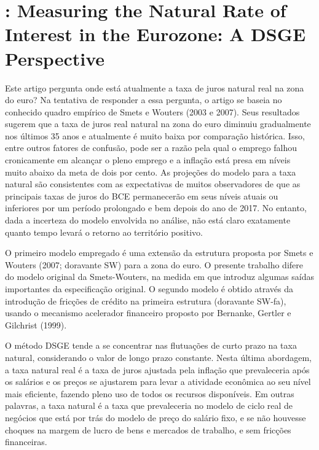 \section{\citet{Hristov:2016}: Measuring the Natural Rate of Interest in the Eurozone: A DSGE Perspective}

Este artigo pergunta onde está atualmente a taxa de juros natural real na zona do euro? Na tentativa de responder a essa pergunta, o artigo se baseia no conhecido quadro empírico de Smets e Wouters (2003 e 2007). Seus resultados sugerem que a taxa de juros real natural na zona do euro diminuiu gradualmente nos últimos 35 anos e atualmente é muito baixa por comparação histórica. Isso, entre outros fatores de confusão, pode ser a razão pela qual o emprego falhou cronicamente em alcançar o pleno emprego e a inflação está presa em níveis muito abaixo da meta de dois por cento. As projeções do modelo para a taxa natural são consistentes com as expectativas de muitos observadores de que as principais taxas de juros do BCE permanecerão em seus níveis atuais ou inferiores por um período prolongado e bem depois do ano de 2017. No entanto, dada a incerteza do modelo envolvida no análise, não está claro exatamente quanto tempo levará o retorno ao território positivo.

O primeiro modelo empregado é uma extensão da estrutura proposta por Smets e Wouters (2007; doravante SW) para a zona do euro. O presente trabalho difere do modelo original da Smets-Wouters, na medida em que introduz algumas saídas importantes da especificação original. O segundo modelo é obtido através da introdução de fricções de crédito na primeira estrutura (doravante SW-fa), usando o mecanismo acelerador financeiro proposto por Bernanke, Gertler e Gilchrist (1999).

O método DSGE tende a se concentrar nas flutuações de curto prazo na taxa natural, considerando o valor de longo prazo constante. Nesta última abordagem, a taxa natural real é a taxa de juros ajustada pela inflação que prevaleceria após os salários e os preços se ajustarem para levar a atividade econômica ao seu nível mais eficiente, fazendo pleno uso de todos os recursos disponíveis. Em outras palavras, a taxa natural é a taxa que prevaleceria no modelo de ciclo real de negócios que está por trás do modelo de preço do salário fixo, e se não houvesse choques na margem de lucro de bens e mercados de trabalho, e sem fricções financeiras.


